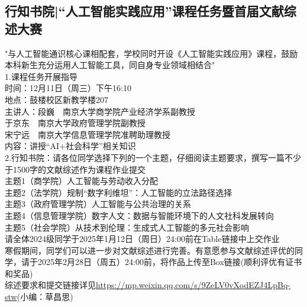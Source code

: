 \documentclass[letterpaper, 12pt]{article}
\begin{document}
\begin{multicols}{2}
\section{行知书院|“人工智能实践应用”课程任务暨首届文献综述大赛}
"与人工智能通识核心课相配套，学校同时开设《人工智能实践应用》课程，鼓励本科新生充分运用人工智能工具，同自身专业领域相结合"\\
1.课程任务开展指导\\
时间：12月11日（周三）下午16:10\\
地点：鼓楼校区新教学楼207\\
主讲人：段巍  南京大学商学院产业经济学系副教授\\
于京东  南京大学政府管理学院副教授\\
宋宁远  南京大学信息管理学院准聘助理教授\\
内容：讲授“AI+社会科学”相关知识\\
2.行知书院：请各位同学选择下列的一个主题，仔细阅读主题要求，撰写一篇不少于1500字的文献综述作为课程作业提交\\
主题1（商学院）人工智能与劳动收入分配\\
主题2（法学院）规制“数字利维坦”：人工智能的立法路径选择\\
主题3（政府管理学院）人工智能与公共治理的关系\\
主题4（信息管理学院）数字人文：数据与智能环境下的人文社科发展转向\\
主题5（社会学院）从技术到伦理：生成式人工智能的多元社会影响\\
请全体2024级同学于2025年1月12日（周日）24:00前在Table链接中上交作业\\
寒假期间，同学们可以进一步对文献综述进行完善。有意愿参与文献综述评优的同学，请于2025年2月28日（周五）24:00前，将作品上传至Box链接(顺利评优有证书和奖品)\\
综述要求和提交链接详见\url{https://mp.weixin.qq.com/s/9ZeLV0vXodEZJ4LpBq-stw}(小编：草昌思)\\



\end{multicols} 
\end{document}
